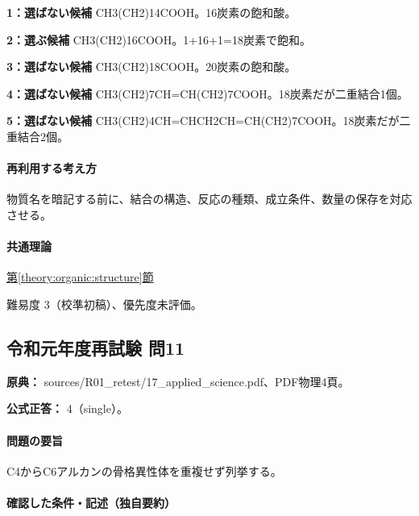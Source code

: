 \noindent\textbf{1：選ばない候補} CH3(CH2)14COOH。16炭素の飽和酸。\par

\noindent\textbf{2：選ぶ候補} CH3(CH2)16COOH。1+16+1=\allowbreak{}18炭素で飽和。\par

\noindent\textbf{3：選ばない候補} CH3(CH2)18COOH。20炭素の飽和酸。\par

\noindent\textbf{4：選ばない候補} CH3(CH2)7CH=\allowbreak{}CH(CH2)7COOH。18炭素だが二重結合1個。\par

\noindent\textbf{5：選ばない候補} CH3(CH2)4CH=\allowbreak{}CHCH2CH=\allowbreak{}CH(CH2)7COOH。18炭素だが二重結合2個。\par

\paragraph{再利用する考え方} 物質名を暗記する前に、結合の構造、反応の種類、成立条件、数量の保存を対応させる。

\paragraph{共通理論} \hyperref[theory:organic:structure]{第\ref*{theory:organic:structure}節}

\par 難易度 3（校準初稿）、優先度未評価。

\subsection{令和元年度再試験 問11}
\label{q:r01-ret-applied-11}

\noindent\textbf{原典：} sources/R01\_retest/17\_applied\_science.pdf、PDF物理4頁。

\textbf{公式正答：} 4（single）。

\paragraph{問題の要旨} C4からC6アルカンの骨格異性体を重複せず列挙する。

\paragraph{確認した条件・記述（独自要約）}\mbox{}\par

